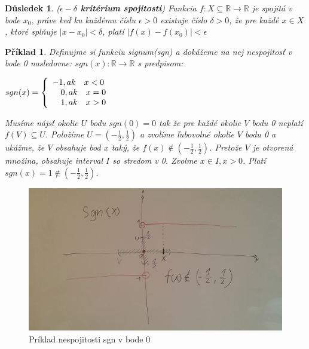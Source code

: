 \documentclass[12pt,a4paper]{article}
\newtheorem{example}{Příklad}
\newtheorem{result}{Důsledek}
\begin{document}
\begin{result}
	(\textbf{$\epsilon -\delta$ kritérium spojitosti}) Funkcia $f: X \subseteq \mathds{R} \rightarrow \mathds{R}$ je spojitá v bode $x_{0}$, práve keď ku každému číslu $\epsilon>0$ existuje číslo $\delta>0$, že pre každé $x \in X$, ktoré splňuje $|x-x_{0}|<\delta$, platí $|f(x)-f(x_{0})|<\epsilon$
\end{result}

\begin{example}
	Definujme si funkciu signum(sgn) a dokážeme na nej nespojitosť v bode 0 nasledovne: $sgn(x): \mathds{R} \rightarrow \mathds{R}$ s predpisom:
	\begin{center}
		$sgn(x) = \left\{ \begin{array}{ll} -1, ak\hspace{0.35cm} x<0 \\ \hspace{0.35cm}0, ak \hspace{0.35cm}x=0 \\ \hspace{0.35cm}1, ak\hspace{0.35cm} x>0 \\ \end{array} \right.$
	\end{center}
	Musíme nájsť okolie $U$ bodu $sgn(0)=0$ tak že pre každé okolie $V$ bodu 0 neplatí $f(V)\subseteq U$. Položíme $U=(-\frac{1}{2}, \frac{1}{2})$ a zvolíme ľubovolné okolie $V$ bodu 0 a ukážme, že $V$ obsahuje bod $x$ taký, že $f(x)\notin (-\frac{1}{2}, \frac{1}{2})$. Pretože $V$ je otvorená množina, obsahuje interval $I$ so stredom v 0. Zvolme $x \in I, x>0$. Platí $sgn(x)=1 \notin (-\frac{1}{2}, \frac{1}{2})$.
\end{example}

\begin{figure}[ht]
	\begin{center}
		\includegraphics[scale=0.2]{img/sgn}
	\end{center}
	\caption{Príklad nespojitosti sgn v bode 0}
\end{figure}
\end{document}
